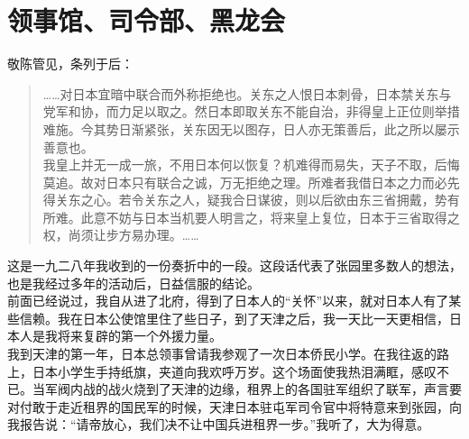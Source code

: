 \fancyhead[RO]{} %
\fancyhead[LE]{} %
\chapter*{领事馆、司令部、黑龙会}
\thispagestyle{empty}
敬陈管见，条列于后：\\

\begin{quote}
	……对日本宜暗中联合而外称拒绝也。关东之人恨日本刺骨，日本禁关东与党军和协，而力足以取之。然日本即取关东不能自治，非得皇上正位则举措难施。今其势日渐紧张，关东因无以图存，日人亦无策善后，此之所以屡示善意也。\\

我皇上并无一成一旅，不用日本何以恢复？机难得而易失，天子不取，后悔莫追。故对日本只有联合之诚，万无拒绝之理。所难者我借日本之力而必先得关东之心。若令关东之人，疑我合日谋彼，则以后欲由东三省拥戴，势有所难。此意不妨与日本当机要人明言之，将来皇上复位，日本于三省取得之权，尚须让步方易办理。……\\
\end{quote}

这是一九二八年我收到的一份奏折中的一段。这段话代表了张园里多数人的想法，也是我经过多年的活动后，日益信服的结论。\\

前面已经说过，我自从进了北府，得到了日本人的“关怀”以来，就对日本人有了某些信赖。我在日本公使馆里住了些日子，到了天津之后，我一天比一天更相信，日本人是我将来复辟的第一个外援力量。\\

我到天津的第一年，日本总领事曾请我参观了一次日本侨民小学。在我往返的路上，日本小学生手持纸旗，夹道向我欢呼万岁。这个场面使我热泪满眶，感叹不已。当军阀内战的战火烧到了天津的边缘，租界上的各国驻军组织了联军，声言要对付敢于走近租界的国民军的时候，天津日本驻屯军司令官中将特意来到张园，向我报告说：“请帝放心，我们决不让中国兵进租界一步。”我听了，大为得意。\\

